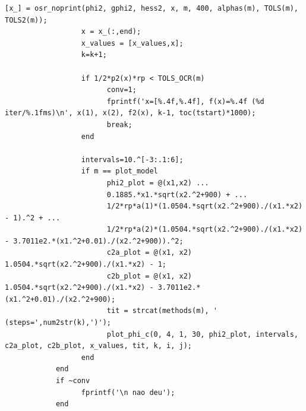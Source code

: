 \documentclass[10pt, a4paper]{article}
\begin{document}
\begin{minipage}{\linewidth}
\begin{lstlisting}[style=myStyle, caption= trecho de c\'odigo do problema 02 (penalidade) (2/2), label=list_p02_pen_2]
                  [x_] = osr_noprint(phi2, gphi2, hess2, x, m, 400, alphas(m), TOLS(m), TOLS2(m));
                  x = x_(:,end);
                  x_values = [x_values,x];
                  k=k+1;

                  if 1/2*p2(x)*rp < TOLS_OCR(m)
                        conv=1;
                        fprintf('x=[%.4f,%.4f], f(x)=%.4f (%d iter/%.1fms)\n', x(1), x(2), f2(x), k-1, toc(tstart)*1000);
                        break;
                  end

                  intervals=10.^[-3:.1:6];
                  if m == plot_model
                        phi2_plot = @(x1,x2) ...
                        0.1885.*x1.*sqrt(x2.^2+900) + ...
                        1/2*rp*a(1)*(1.0504.*sqrt(x2.^2+900)./(x1.*x2) - 1).^2 + ...
                        1/2*rp*a(2)*(1.0504.*sqrt(x2.^2+900)./(x1.*x2) - 3.7011e2.*(x1.^2+0.01)./(x2.^2+900)).^2;
                        c2a_plot = @(x1, x2) 1.0504.*sqrt(x2.^2+900)./(x1.*x2) - 1;
                        c2b_plot = @(x1, x2) 1.0504.*sqrt(x2.^2+900)./(x1.*x2) - 3.7011e2.*(x1.^2+0.01)./(x2.^2+900);
                        tit = strcat(methods(m), ' (steps=',num2str(k),')');
                        plot_phi_c(0, 4, 1, 30, phi2_plot, intervals, c2a_plot, c2b_plot, x_values, tit, k, i, j);
                  end
            end
            if ~conv
                  fprintf('\n nao deu');
            end
      \end{lstlisting}
\end{minipage}
\end{document}
